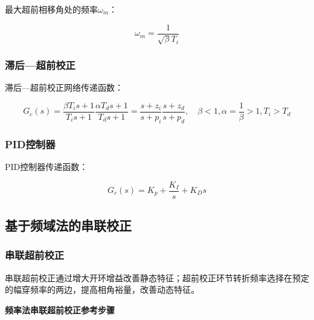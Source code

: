 \documentclass[cn, blue, normal, 12pt]{elegantnote}
\begin{document}
最大超前相移角处的频率$\omega_m$：

\begin{equation}
    \omega_m=\frac{1}{\sqrt{\beta}T_i}
\end{equation}

\subsubsection{滞后—超前校正}

滞后—超前校正网络传递函数：

\begin{equation}
    G_c(s)=\frac{\beta T_i s+1}{T_i s+1}\frac{\alpha T_d s+1}{T_d s+1}=\frac{s+z_i}{s+p_i}\frac{s+z_d}{s+p_d}, \quad \beta<1, \alpha=\frac{1}{\beta}>1,T_i>T_d
\end{equation}

\subsubsection{PID控制器}

PID控制器传递函数：

\begin{equation}
    G_c(s)=K_p+\frac{K_I}{s}+K_D s
\end{equation}

\subsection{基于频域法的串联校正}

\subsubsection{串联超前校正}

串联超前校正通过增大开环增益改善静态特征；超前校正环节转折频率选择在预定的幅穿频率的两边，提高相角裕量，改善动态特征。

\textbf{频率法串联超前校正参考步骤}
\end{document}

